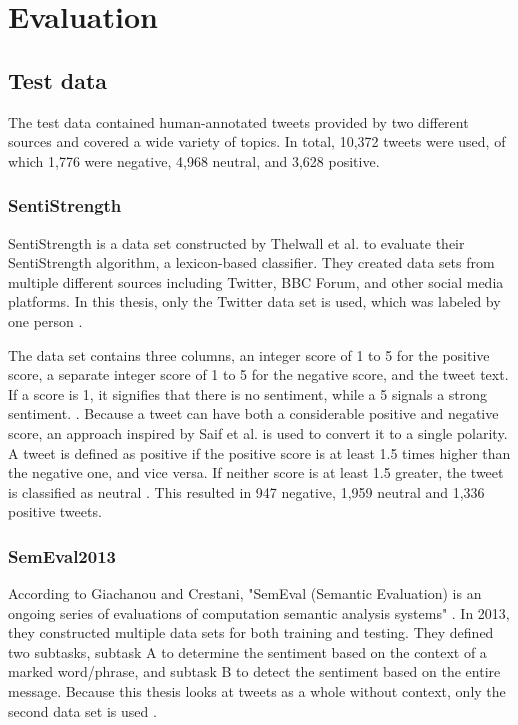 \section{Evaluation}

\subsection{Test data}

The test data contained human-annotated tweets provided by two different sources and covered a wide variety of topics. In total, 10,372 tweets were used, of which 1,776 were negative, 4,968 neutral, and 3,628 positive.

\subsubsection{SentiStrength}
SentiStrength is a data set constructed by Thelwall et al. to evaluate their SentiStrength algorithm, a lexicon-based classifier. They created data sets from multiple different sources including Twitter, BBC Forum, and other social media platforms. In this thesis, only the Twitter data set is used, which was labeled by one person \cite{10.1002/asi.21662}.

The data set contains three columns, an integer score of 1 to 5 for the positive score, a separate integer score of 1 to 5 for the negative score, and the tweet text. If a score is 1, it signifies that there is no sentiment, while a 5 signals a strong sentiment. \cite{10.1002/asi.21662}. Because a tweet can have both a considerable positive and negative score, an approach inspired by Saif et al. is used to convert it to a single polarity. A tweet is defined as positive if the positive score is at least 1.5 times higher than the negative one, and vice versa. If neither score is at least 1.5 greater, the tweet is classified as neutral \cite{oro40660}. This resulted in 947 negative, 1,959 neutral and 1,336 positive tweets.


\subsubsection{SemEval2013}
According to Giachanou and Crestani, "SemEval (Semantic Evaluation) is an ongoing series of evaluations of computation semantic analysis systems" \cite[p.~28:31]{DBLP:journals/csur/GiachanouC16}. In 2013, they constructed multiple data sets for both training and testing. They defined two subtasks, subtask A to determine the sentiment based on the context of a marked word/phrase, and subtask B to detect the sentiment based on the entire message. Because this thesis looks at tweets as a whole without context, only the second data set is used \cite{nakov-etal-2013-semeval}.

